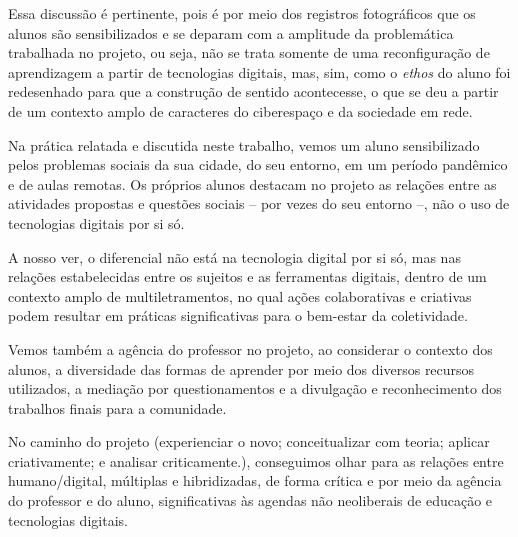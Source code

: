 Essa discussão é pertinente, pois é por meio dos registros fotográficos que os alunos são sensibilizados e se deparam com a amplitude da problemática trabalhada no projeto, ou seja, não se trata somente de uma reconfiguração de aprendizagem a partir de tecnologias digitais, mas, sim, como o \textit{ethos} do aluno foi redesenhado para que a construção de sentido acontecesse, o que se deu a partir de um contexto amplo de caracteres do ciberespaço e da sociedade em rede.


	Na prática relatada e discutida neste trabalho, vemos um aluno sensibilizado pelos problemas sociais da sua cidade, do seu entorno, em um período pandêmico e de aulas remotas. Os próprios alunos destacam no projeto as relações entre as atividades propostas e questões sociais – por vezes do seu entorno –, não o uso de tecnologias digitais por si só.


	A nosso ver, o diferencial não está na tecnologia digital por si só, mas nas relações estabelecidas entre os sujeitos e as ferramentas digitais, dentro de um contexto amplo de multiletramentos, no qual ações colaborativas e criativas podem resultar em práticas significativas para o bem-estar da coletividade.


	Vemos também a agência do professor no projeto, ao considerar o contexto dos alunos, a diversidade das formas de aprender por meio dos diversos recursos utilizados, a mediação por questionamentos e a divulgação e reconhecimento dos trabalhos finais para a comunidade.

No caminho do projeto (experienciar o novo; conceitualizar com teoria; aplicar criativamente; e analisar criticamente.), conseguimos olhar para as relações entre humano/digital, múltiplas e hibridizadas, de forma crítica e por meio da agência do professor e do aluno, significativas às agendas não neoliberais de educação e tecnologias digitais.